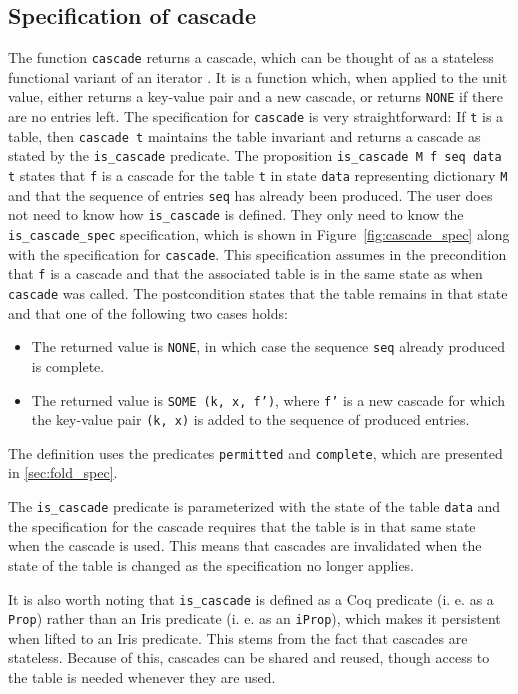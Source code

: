 \documentclass[10pt,a4paper]{article}
\begin{document}
\subsection{Specification of cascade}
The function \texttt{cascade} returns a cascade, which can be thought of as a stateless functional variant of an iterator \cite{Gamma:1995:DPE:186897}. It is a function which, when applied to the unit value, either returns a key-value pair and a new cascade, or returns \texttt{NONE} if there are no entries left. The specification for \texttt{cascade} is very straightforward: If \texttt{t} is a table, then \texttt{cascade t} maintains the table invariant and returns a cascade as stated by the \texttt{is\_cascade} predicate. The proposition \texttt{is\_cascade M f seq data t} states that \texttt{f} is a cascade for the table \texttt{t} in state \texttt{data} representing dictionary \texttt{M} and that the sequence of entries \texttt{seq} has already been produced. The user does not need to know how \texttt{is\_cascade} is defined. They only need to know the \texttt{is\_cascade\_spec} specification, which is shown in Figure~\ref{fig:cascade_spec} along with the specification for \texttt{cascade}. This specification assumes in the precondition that \texttt{f} is a cascade and that the associated table is in the same state as when \texttt{cascade} was called. The postcondition states that the table remains in that state and that one of the following two cases holds:
\begin{itemize}
\item The returned value is \texttt{NONE}, in which case the sequence \texttt{seq} already produced is complete.
\item The returned value is \texttt{SOME (k, x, f')}, where \texttt{f'} is a new cascade for which the key-value pair \texttt{(k, x)} is added to the sequence of produced entries.
\end{itemize}
The definition uses the predicates \texttt{permitted} and \texttt{complete}, which are presented in \ref{sec:fold_spec}. 

The \texttt{is\_cascade} predicate is parameterized with the state of the table \texttt{data} and the specification for the cascade requires that the table is in that same state when the cascade is used. This means that cascades are invalidated when the state of the table is changed as the specification no longer applies.

It is also worth noting that \texttt{is\_cascade} is defined as a Coq predicate (i. e. as a \texttt{Prop}) rather than an Iris predicate (i. e. as an \texttt{iProp}), which makes it persistent when lifted to an Iris predicate. This stems from the fact that cascades are stateless. Because of this, cascades can be shared and reused, though access to the table is needed whenever they are used.
\end{document}
